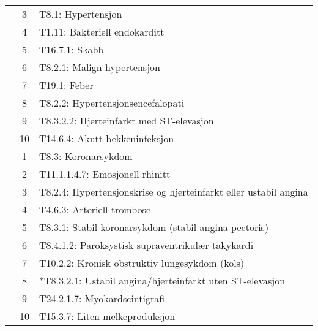 \documentclass[a4paper, 11pt]{article}
\begin{document}
\begin{table}[htbp]
\begin{tabular}{c c l}
	 & 3 & T8.1: Hypertensjon \\
	 & 4 & T1.11: Bakteriell endokarditt \\
	 & 5 & T16.7.1: Skabb \\
	 & 6 & T8.2.1: Malign hypertensjon \\
	 & 7 & T19.1: Feber \\
	 & 8 & T8.2.2: Hypertensjonsencefalopati \\
	 & 9 & T8.3.2.2: Hjerteinfarkt med ST-elevasjon \\
	 & 10 & T14.6.4: Akutt bekkeninfeksjon \\
	\addlinespace
	4 & 1 & T8.3: Koronarsykdom \\
	 & 2 & T11.1.1.4.7: Emosjonell rhinitt \\
	 & 3 & T8.2.4: Hypertensjonskrise og hjerteinfarkt eller ustabil angina \\
	 & 4 & T4.6.3: Arteriell trombose \\
	 & 5 & T8.3.1: Stabil koronarsykdom (stabil angina pectoris) \\
	 & 6 & T8.4.1.2: Paroksystisk supraventrikulær takykardi \\
	 & 7 & T10.2.2: Kronisk obstruktiv lungesykdom (kols) \\
	 & 8 & *T8.3.2.1: Ustabil angina/hjerteinfarkt uten ST-elevasjon \\
	 & 9 & T24.2.1.7: Myokardscintigrafi \\
	 & 10 & T15.3.7: Liten melkeproduksjon \\
	\bottomrule
\end{tabular}
\end{table}
\end{document}
